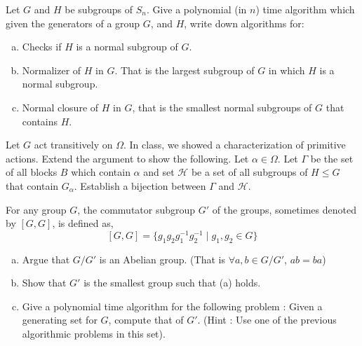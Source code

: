 \begin{ps1}
Let $G$ and $H$ be subgroups of $S_n$. Give a polynomial (in $n$) time algorithm which given the generators of a group $G$, and $H$, write down algorithms for:
\begin{enumerate}[(a)]
\item Checks if $H$ is a normal subgroup of $G$.
\item Normalizer of $H$ in $G$. That is the largest subgroup of $G$ in which $H$ is a normal subgroup.
\item Normal closure of $H$ in $G$, that is the smallest normal subgroups of $G$ that contains $H$.
\end{enumerate}
\end{ps1}


\begin{ps1}
Let $G$ act transitively on $\Omega$. In class, we showed a characterization of primitive actions. Extend the argument to show the following. Let $\alpha \in \Omega$. Let $\Gamma$ be the set of all blocks $B$ which contain $\alpha$ and set $\mathcal{H}$ be a set of all subgroups of $H \le G$ that contain $G_\alpha$. Establish a bijection between $\Gamma$ and $\mathcal{H}$.
\end{ps1}

\begin{ps1}
For any group $G$, the commutator subgroup $G'$ of the groups, sometimes denoted by $[G,G]$, is defined as,
\[ [G,G] = \{g_1g_2g_1^{-1}g_2^{-1} \mid g_1, g_2 \in G \} \]
\begin{enumerate}[(a)]
\item Argue that $G/G'$ is an Abelian group. (That is $\forall a,b \in G/G'$, $ab = ba$)
\item Show that $G'$ is the smallest group such that (a) holds.
\item Give a polynomial time algorithm for the following problem : Given a generating set for $G$, compute that of $G'$. (Hint : Use one of the previous algorithmic problems in this set).
\end{enumerate}
\end{ps1}



